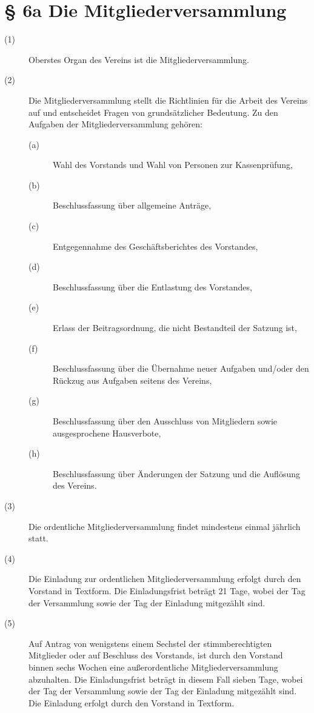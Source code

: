 \documentclass[a4paper,12pt]{scrartcl}
\begin{document}
\section*{\S{} 6a Die Mitgliederversammlung}
\begin{description} 

\item[(1)] Oberstes Organ des Vereins ist die Mitgliederversammlung.
\item[(2)] Die Mitgliederversammlung stellt die Richtlinien für die Arbeit des Vereins auf und entscheidet Fragen von grundsätzlicher Bedeutung. Zu den Aufgaben der Mitgliederversammlung gehören:
\begin{description} 
\item[(a)] Wahl des Vorstands und Wahl von Personen zur Kassenprüfung,
\item[(b)] Beschlussfassung über allgemeine Anträge,
\item[(c)] Entgegennahme des Geschäftsberichtes des Vorstandes,
\item[(d)] Beschlussfassung über die Entlastung des Vorstandes,
\item[(e)] Erlass der Beitragsordnung, die nicht Bestandteil der Satzung ist,
\item[(f)] Beschlussfassung über die Übernahme neuer Aufgaben und/oder den Rückzug aus Aufgaben seitens des Vereins,
\item[(g)] Beschlussfassung über den Ausschluss von Mitgliedern sowie ausgesprochene Hausverbote,
\item[(h)] Beschlussfassung über Änderungen der Satzung und die Auflösung des Vereins.
\end{description}
\item[(3)] Die ordentliche Mitgliederversammlung findet mindestens einmal jährlich statt.
\item[(4)] Die Einladung zur ordentlichen Mitgliederversammlung erfolgt durch den Vorstand in Textform. Die Einladungsfrist beträgt 21 Tage, wobei der Tag der Versammlung sowie der Tag der Einladung mitgezählt sind.
\item[(5)] Auf Antrag von wenigstens einem Sechstel der stimmberechtigten Mitglieder oder auf Beschluss des Vorstands, ist durch den Vorstand binnen sechs Wochen eine außerordentliche Mitgliederversammlung abzuhalten. Die Einladungsfrist beträgt in diesem Fall sieben Tage, wobei der Tag der Versammlung sowie der Tag der Einladung mitgezählt sind. Die Einladung erfolgt durch den Vorstand in Textform.

\end{description}
\end{document}
